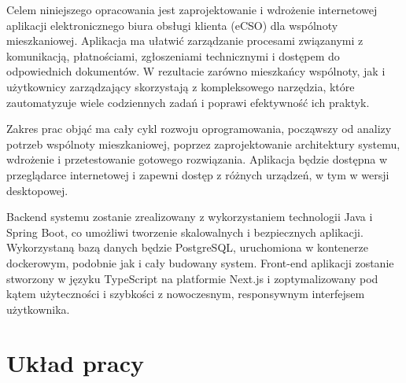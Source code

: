 

Celem niniejszego opracowania jest zaprojektowanie i wdrożenie internetowej aplikacji elektronicznego biura obsługi klienta (eCSO) dla wspólnoty mieszkaniowej. Aplikacja ma ułatwić zarządzanie procesami związanymi z komunikacją, płatnościami, zgłoszeniami technicznymi i dostępem do odpowiednich dokumentów. W rezultacie zarówno mieszkańcy wspólnoty, jak i użytkownicy zarządzający skorzystają z kompleksowego narzędzia, które zautomatyzuje wiele codziennych zadań i poprawi efektywność ich praktyk.

Zakres prac objąć ma cały cykl rozwoju oprogramowania, począwszy od analizy potrzeb wspólnoty mieszkaniowej, poprzez zaprojektowanie architektury systemu, wdrożenie i przetestowanie gotowego rozwiązania. Aplikacja będzie dostępna w przeglądarce internetowej i zapewni dostęp z różnych urządzeń, w tym w wersji desktopowej. 

Backend systemu zostanie zrealizowany z wykorzystaniem technologii Java i Spring Boot, co umożliwi tworzenie skalowalnych i bezpiecznych aplikacji. Wykorzystaną bazą danych będzie PostgreSQL, uruchomiona w kontenerze dockerowym, podobnie jak i cały budowany system. Front-end aplikacji zostanie stworzony w języku TypeScript na platformie Next.js i zoptymalizowany pod kątem użyteczności i szybkości z nowoczesnym, responsywnym interfejsem użytkownika. 

\section{Układ pracy}
